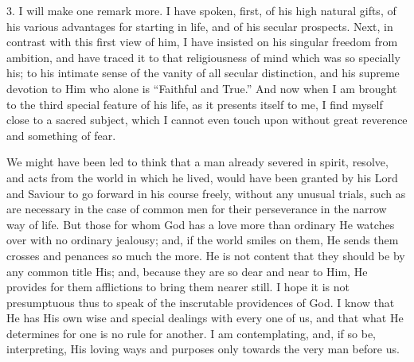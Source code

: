 3. I will make one remark more. I have spoken, first,
of his high natural gifts, of his various advantages for
starting in life, and of his secular prospects. Next, in
contrast with this first view of him, I have insisted on
his singular freedom from ambition, and have traced it to
that religiousness of mind which was so specially his; to
his intimate sense of the vanity of all secular
distinction, and his supreme devotion to Him who alone is
``Faithful and True.'' And now when I am brought
to the third special feature of his life, as it presents
itself to me, I find myself close to a sacred subject,
which I cannot even touch upon without great reverence
and something of fear.

We might have been led to think that a man already
severed in spirit, resolve, and acts from the world in
which he lived, would have been granted by his Lord and
Saviour to go forward in his course freely, without any
unusual trials, such as are necessary in the case of
common men for their perseverance in the narrow way of
life. But those for whom God has a love more than
ordinary He watches over with no ordinary jealousy; and,
if the world smiles on them, He sends them crosses and
penances so much the more. He is not content that they
should be by any common title His; and, because they are
so dear and near to Him, He provides for them afflictions
to bring them nearer still. I hope it is not presumptuous
thus to speak of the inscrutable providences of God. I
know that He has His own wise and special dealings with
every one of us, and that what He determines for one is
no rule for another. I am contemplating, and, if so be,
interpreting, His loving ways and purposes only towards
the very man before us.

